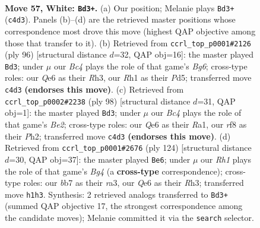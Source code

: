\documentclass[11pt]{article}
\begin{document}
\clearpage

\begin{figure}[p]\centering
\begin{subfigure}{0.46\textwidth}\centering
\resizebox{\linewidth}{!}{%
\newchessgame
\chessboard[
  setfen={5r2/1b5k/4Q3/8/2B4P/8/1p4P1/6KR w - - 5 57},
  showmover=false,
  pgfstyle=straightmove, color=movearrow, markmove={c4-d3}
]}
\caption{}
\end{subfigure}\hfill
\begin{subfigure}{0.46\textwidth}\centering
\resizebox{\linewidth}{!}{%
\newchessgame
\chessboard[
  setfen={6k1/1r6/3p2B1/3Pb3/8/1P5R/6K1/8 w - - 1 49},
  showmover=false,
  pgfstyle=straightmove, color=movearrow, markmove={g6-d3}
]}
\caption{}
\end{subfigure}
\\[4pt]
\begin{subfigure}{0.46\textwidth}\centering
\resizebox{\linewidth}{!}{%
\newchessgame
\chessboard[
  setfen={8/3n1kpp/8/r7/P7/8/4B2P/R6K w - - 1 50},
  showmover=false,
  pgfstyle=straightmove, color=movearrow, markmove={e2-d3}
]}
\caption{}
\end{subfigure}\hfill
\begin{subfigure}{0.46\textwidth}\centering
\resizebox{\linewidth}{!}{%
\newchessgame
\chessboard[
  setfen={8/8/1k6/4b3/4P1B1/r3PK1R/8/8 w - - 9 63},
  showmover=false,
  pgfstyle=straightmove, color=movearrow, markmove={g4-e6}
]}
\caption{}
\end{subfigure}
\caption{\textbf{Move 57, White: \texttt{Bd3+}.} (a) Our position; Melanie plays \texttt{Bd3+} (\texttt{c4d3}). Panels (b)--(d) are the retrieved master positions whose correspondence most drove this move (highest QAP objective among those that transfer to it). (b) Retrieved from \texttt{ccrl\_top\_p0001\#2126} (ply 96) [structural distance $d$=32, QAP obj=16]: the master played \texttt{Bd3}; under $\mu$ our \emph{Bc4} plays the role of that game's \emph{Bg6}; cross-type roles: our \emph{Q}e6 as their \emph{R}h3, our \emph{R}h1 as their \emph{P}d5; transferred move \texttt{c4d3} \textbf{(endorses this move)}. (c) Retrieved from \texttt{ccrl\_top\_p0002\#2238} (ply 98) [structural distance $d$=31, QAP obj=1]: the master played \texttt{Bd3}; under $\mu$ our \emph{Bc4} plays the role of that game's \emph{Be2}; cross-type roles: our \emph{Q}e6 as their \emph{R}a1, our \emph{r}f8 as their \emph{P}h2; transferred move \texttt{c4d3} \textbf{(endorses this move)}. (d) Retrieved from \texttt{ccrl\_top\_p0001\#2676} (ply 124) [structural distance $d$=30, QAP obj=37]: the master played \texttt{Be6}; under $\mu$ our \emph{Rh1} plays the role of that game's \emph{Bg4} (a \textbf{cross-type} correspondence); cross-type roles: our \emph{b}b7 as their \emph{r}a3, our \emph{Q}e6 as their \emph{R}h3; transferred move \texttt{h1h3}. Synthesis: 2 retrieved analogs transferred to \texttt{Bd3+} (summed QAP objective 17, the strongest correspondence among the candidate moves); Melanie committed it via the \texttt{search} selector.}
\label{fig:thought-m112}
\end{figure}
\end{document}
